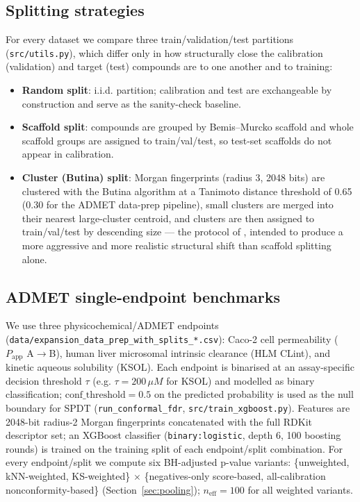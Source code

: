 \documentclass[11pt]{article}
\begin{document}
\subsection{Splitting strategies}
For every dataset we compare three train/validation/test partitions
(\texttt{src/utils.py}), which differ only in how structurally close the
calibration (validation) and target (test) compounds are to one another and
to training:
\begin{itemize}
    \item \textbf{Random split}: i.i.d. partition; calibration and test are
    exchangeable by construction and serve as the sanity-check baseline.
    \item \textbf{Scaffold split}: compounds are grouped by Bemis--Murcko
    scaffold and whole scaffold groups are assigned to train/val/test, so
    test-set scaffolds do not appear in calibration.
    \item \textbf{Cluster (Butina) split}: Morgan fingerprints (radius 3,
    2048 bits) are clustered with the Butina algorithm at a Tanimoto distance
    threshold of 0.65 (0.30 for the ADMET data-prep pipeline), small clusters
    are merged into their nearest large-cluster centroid, and clusters are
    then assigned to train/val/test by descending size --- the protocol of
    \citet{schiebroek2026}, intended to produce a more aggressive and more
    realistic structural shift than scaffold splitting alone.
\end{itemize}

\subsection{ADMET single-endpoint benchmarks}
\label{sec:data-admet}
We use three physicochemical/ADMET endpoints (\texttt{data/expansion\_data\_prep\_with\_splits\_*.csv}):
Caco-2 cell permeability ($P_{\mathrm{app}}$ A$\to$B), human liver microsomal
intrinsic clearance (HLM CLint), and kinetic aqueous solubility (KSOL). Each
endpoint is binarised at an assay-specific decision threshold $\tau$ (e.g.
$\tau = 200\,\mu M$ for KSOL) and modelled as binary classification;
$\mathrm{conf\_threshold}=0.5$ on the predicted probability is used as the
null boundary for SPDT (\texttt{run\_conformal\_fdr},
\texttt{src/train\_xgboost.py}). Features are 2048-bit radius-2 Morgan
fingerprints concatenated with the full RDKit descriptor set; an XGBoost
classifier (\texttt{binary:logistic}, depth 6, 100 boosting rounds) is trained
on the training split of each endpoint/split combination. For every
endpoint/split we compute six BH-adjusted p-value variants: \{unweighted,
kNN-weighted, KS-weighted\} $\times$ \{negatives-only score-based, all-calibration
nonconformity-based\} (Section~\ref{sec:pooling}); $n_{\mathrm{eff}}=100$ for
all weighted variants.
\end{document}
